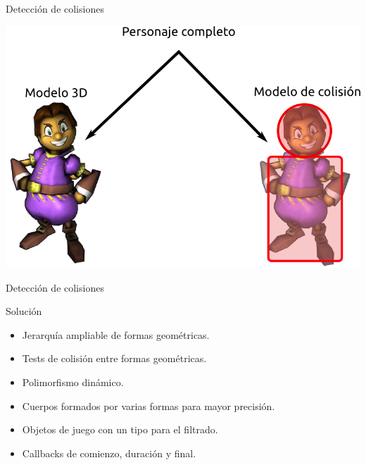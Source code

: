 \documentclass[green]{beamer}
\begin{document}
\begin{frame}{Detección de colisiones}
    
    \begin{center}
	\includegraphics[scale=0.6]{img/colisiones.png}
    \end{center}
\end{frame}

\begin{frame}{Detección de colisiones}

    \begin{block}{Solución}
	\begin{itemize}
	    \item Jerarquía ampliable de formas geométricas.
	    \item Tests de colisión entre formas geométricas.
	    \item Polimorfismo dinámico.
	    \item Cuerpos formados por varias formas para mayor precisión.
	    \item Objetos de juego con un tipo para el filtrado.
	    \item Callbacks de comienzo, duración y final.
	\end{itemize}
    \end{block}
    
\end{frame}
\end{document}
